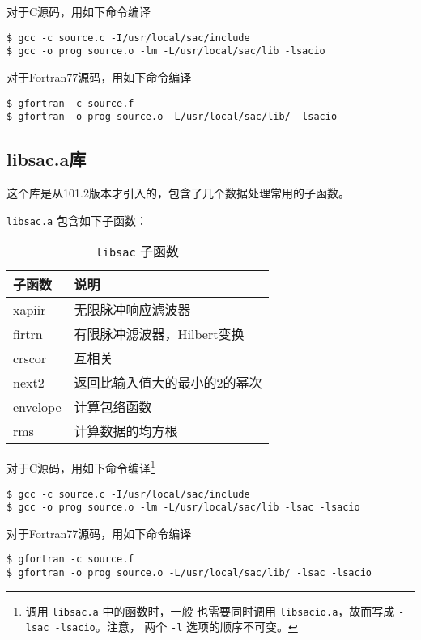 对于C源码，用如下命令编译
\begin{verbatim}
$ gcc -c source.c -I/usr/local/sac/include
$ gcc -o prog source.o -lm -L/usr/local/sac/lib -lsacio
\end{verbatim}

对于Fortran77源码，用如下命令编译
\begin{verbatim}
$ gfortran -c source.f
$ gfortran -o prog source.o -L/usr/local/sac/lib/ -lsacio
\end{verbatim}

\subsection{libsac.a库}
这个库是从101.2版本才引入的，包含了几个数据处理常用的子函数。

\texttt{libsac.a} 包含如下子函数：
\begin{table}[H]
\centering
\caption{\texttt{libsac} 子函数}
\ttfamily
\begin{tabular}{ll}
\toprule
子函数      &       说明            \\
\midrule
xapiir      &       无限脉冲响应滤波器 \\
firtrn      &       有限脉冲滤波器，Hilbert变换 \\
crscor      &       互相关 \\
next2       &       返回比输入值大的最小的2的幂次 \\
envelope    &       计算包络函数 \\
rms         &       计算数据的均方根 \\
\bottomrule
\end{tabular}
\end{table}

对于C源码，用如下命令编译\footnote{调用 \texttt{libsac.a} 中的函数时，一般
也需要同时调用 \texttt{libsacio.a}，故而写成 \texttt{-lsac -lsacio}。注意，
两个 \texttt{-l} 选项的顺序不可变。}
\begin{verbatim}
$ gcc -c source.c -I/usr/local/sac/include
$ gcc -o prog source.o -lm -L/usr/local/sac/lib -lsac -lsacio
\end{verbatim}

对于Fortran77源码，用如下命令编译
\begin{verbatim}
$ gfortran -c source.f
$ gfortran -o prog source.o -L/usr/local/sac/lib/ -lsac -lsacio
\end{verbatim}

